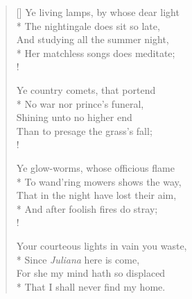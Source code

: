 \documentclass[MAIN]{subfiles}
\begin{document}
\settowidth{\versewidth}{Ye living lamps, by whose dear light}
\begin{verse}[\versewidth]
Ye living lamps, by whose dear light\\*
\vin The nightingale does sit so late,\\
And studying all the summer night,\\*
\vin Her matchless songs does meditate;\\!

Ye country comets, that portend\\*
\vin No war nor prince's funeral,\\
Shining unto no higher end\\
\vin Than to presage the grass's fall;\\!

Ye glow-worms, whose officious flame\\*
\vin To wand'ring mowers shows the way,\\
That in the night have lost their aim,\\*
\vin And after foolish fires do stray;\\!

Your courteous lights in vain you waste,\\*
\vin Since \emph{Juliana} here is come,\\
For she my mind hath so displaced\\*
\vin That I shall never find my home.
\end{verse}
\end{document}
